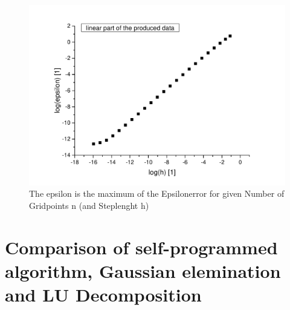 \documentclass[10pt,a4paper]{article}
\begin{document}
\begin{figure}[h]
\centering
\includegraphics[scale=0.5]{epsilon_plot_log.pdf}
\caption{The epsilon is the maximum of the Epsilonerror for given Number of Gridpoints n (and Steplenght h) }
\label{linear plot}
\end{figure}

\section{Comparison of self-programmed algorithm, Gaussian elemination and LU Decomposition }
\end{document}
